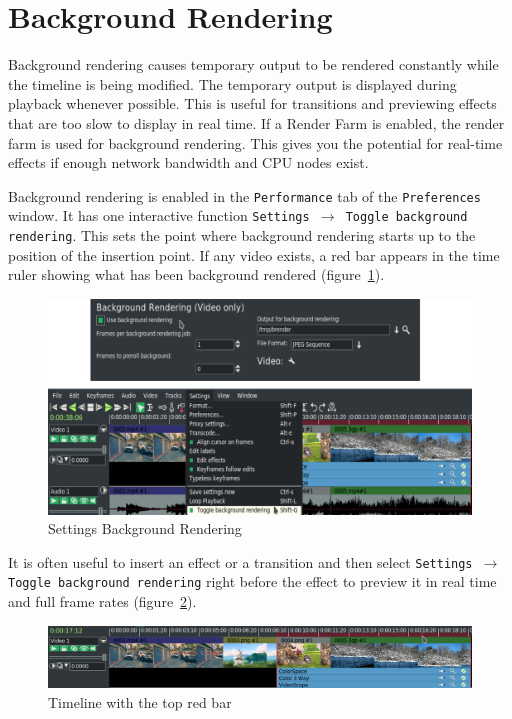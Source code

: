\section{Background Rendering}%
\label{sec:background_rendering}

Background rendering causes temporary output to be rendered constantly while the timeline is being modified. The temporary output is displayed during playback whenever possible. This is useful for transitions and previewing effects that are too slow to display in real time. If a Render Farm is enabled, the render farm is used for background rendering. This gives you the potential for real-time effects if enough network bandwidth and CPU nodes exist.

Background rendering is enabled in the \texttt{Performance} tab of the \texttt{Preferences} window. It has one interactive function \texttt{Settings $\rightarrow$ Toggle background rendering}. This sets the point where background rendering starts up to the position of the insertion point. If any video exists, a red bar appears in the time ruler showing what has been background rendered (figure~\ref{fig:back-ren02}).

\begin{figure}[htpb]
    \centering
    \includegraphics[width=0.8\linewidth]{images/back-ren02.png}
    \caption{Settings Background Rendering}
    \label{fig:back-ren02}
\end{figure}

It is often useful to insert an effect or a transition and then select \texttt{Settings $\rightarrow$ Toggle background rendering} right before the effect to preview it in real time and full frame rates (figure~\ref{fig:back-ren}).

\begin{figure}[htpb]
    \centering
    \includegraphics[width=0.8\linewidth]{images/back-ren.png}
    \caption{Timeline with the top red bar}
    \label{fig:back-ren}
\end{figure}

